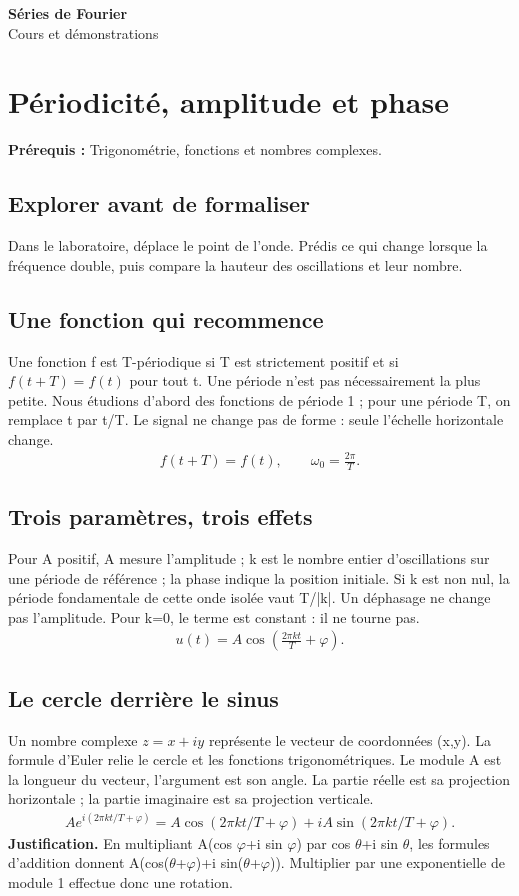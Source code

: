 \documentclass[11pt,a4paper]{article}
\newcommand{\editiontitle}[1]{\begin{center}{\Large\bfseries Séries de Fourier}\\[8pt]#1\end{center}}
\begin{document}
\editiontitle{Cours et démonstrations}\tableofcontents\clearpage
\section{Périodicité, amplitude et phase}
\textbf{Prérequis :} Trigonométrie, fonctions et nombres complexes.
\subsection*{Explorer avant de formaliser}Dans le laboratoire, déplace le point de l’onde. Prédis ce qui change lorsque la fréquence double, puis compare la hauteur des oscillations et leur nombre.
\subsection{Une fonction qui recommence}
Une fonction f est T-périodique si T est strictement positif et si $f(t+T)=f(t)$ pour tout t. Une période n’est pas nécessairement la plus petite. Nous étudions d’abord des fonctions de période 1 ; pour une période T, on remplace t par t/T. Le signal ne change pas de forme : seule l’échelle horizontale change.
\[\begin{gathered}f(t+T)=f(t),\qquad \omega_0=\frac{2\pi}{T}.\end{gathered}\]
\subsection{Trois paramètres, trois effets}
Pour A positif, A mesure l’amplitude ; k est le nombre entier d’oscillations sur une période de référence ; la phase indique la position initiale. Si k est non nul, la période fondamentale de cette onde isolée vaut T/|k|. Un déphasage ne change pas l’amplitude. Pour k=0, le terme est constant : il ne tourne pas.
\[\begin{gathered}u(t)=A\cos\left(\frac{2\pi k t}{T}+\varphi\right).\end{gathered}\]
\subsection{Le cercle derrière le sinus}
Un nombre complexe $z=x+iy$ représente le vecteur de coordonnées (x,y). La formule d’Euler relie le cercle et les fonctions trigonométriques. Le module A est la longueur du vecteur, l’argument est son angle. La partie réelle est sa projection horizontale ; la partie imaginaire est sa projection verticale.
\[\begin{gathered}Ae^{i(2\pi kt/T+\varphi)}=A\cos(2\pi kt/T+\varphi)+iA\sin(2\pi kt/T+\varphi).\end{gathered}\]
\textbf{Justification.} En multipliant A(cos $\varphi$+i sin $\varphi$) par cos $\theta$+i sin $\theta$, les formules d’addition donnent A(cos($\theta$+$\varphi$)+i sin($\theta$+$\varphi$)). Multiplier par une exponentielle de module 1 effectue donc une rotation.
\end{document}
